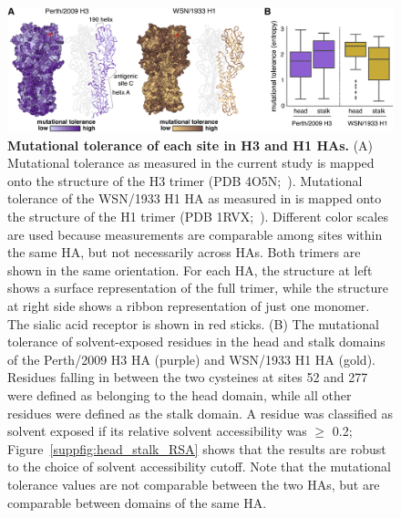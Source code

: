 \documentclass[9pt,twocolumn,twoside]{pnas-new}
\begin{document}
\begin{figure}[ht]
\centering
\includegraphics[width=\textwidth]{figs/mut_tolerance/mut_tolerance_new.pdf}
\caption{\label{fig:mut_tolerance}
{\bf Mutational tolerance of each site in H3 and H1 HAs.}
(A) Mutational tolerance as measured in the current study is mapped onto the structure of the H3 trimer (PDB 4O5N;~\cite{lee2014receptor}).
Mutational tolerance of the WSN/1933 H1 HA as measured in \cite{doud2016accurate} is mapped onto the structure of the H1 trimer (PDB 1RVX;~\cite{gamblin2004structure}).
Different color scales are used because measurements are comparable among sites within the same HA, but not necessarily across HAs.
Both trimers are shown in the same orientation.
For each HA, the structure at left shows a surface representation of the full trimer, while the structure at right side shows a ribbon representation of just one monomer.
The sialic acid receptor is shown in red sticks.
(B) The mutational tolerance of solvent-exposed residues in the head and stalk domains of the Perth/2009 H3 HA (purple) and WSN/1933 H1 HA (gold).
Residues falling in between the two cysteines at sites 52 and 277 were defined as belonging to the head domain, while all other residues were defined as the stalk domain.
A residue was classified as solvent exposed if its relative solvent accessibility was $\geq$ 0.2; Figure~\ref{suppfig:head_stalk_RSA} shows that the results are robust to the choice of solvent accessibility cutoff.
Note that the mutational tolerance values are not comparable between the two HAs, but are comparable between domains of the same HA.
}
\end{figure}
\end{document}
